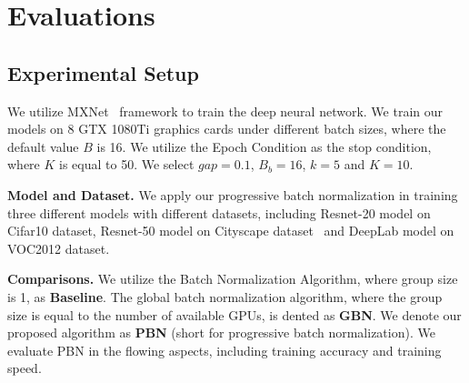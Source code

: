 \documentclass{llncs}
\begin{document}



\section{Evaluations}


\subsection{Experimental Setup}
We utilize MXNet~\cite{chen2015mxnet} framework to train the deep neural network. 
We train our models on 8 GTX 1080Ti graphics cards under different batch sizes, where the default value $B$ is 16. We utilize the Epoch Condition as the stop condition, where $K$ is equal to 50. We select $gap=0.1$, $B_b=16$, $k=5$ and $K=10$.

{\bf Model and Dataset. }We apply our progressive batch normalization 
in training three different models with different datasets, including Resnet-20 model on Cifar10 dataset, Resnet-50 model on Cityscape dataset~\cite{cityscapes} and DeepLab model on VOC2012 dataset. 

{\bf Comparisons. } We utilize the Batch Normalization Algorithm, where group size is 1, as {\bf Baseline}. 
The global batch normalization algorithm, where the group size is equal to the number of available GPUs, is dented as {\bf GBN}. We denote our proposed algorithm as {\bf PBN} (short for progressive batch normalization).
We evaluate PBN in the flowing aspects, including training accuracy and training speed.


\end{document}
